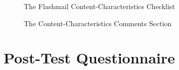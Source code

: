 \begin{figure}[htb]
  {\centerline{}}
  \caption{The Flashmail Content-Characteristics Checklist}
  \label{Checklist}
\end{figure}


\begin{figure}[htb]
  {\centerline{}}
  \caption{The Content-Characteristics Comments Section }
  \label{Comments}
\end{figure}



\newpage
\chapter{Post-Test Questionnaire}
